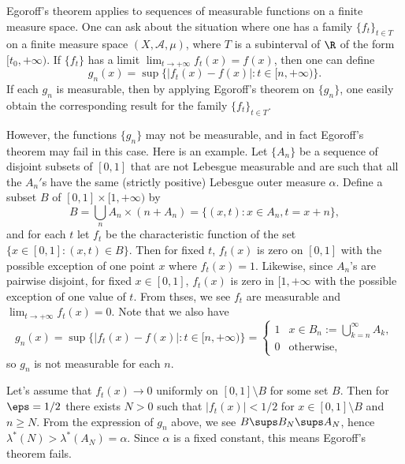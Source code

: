 \begin{example}
Egoroff's theorem applies to sequences of measurable functions on a finite measure space. One can ask about the situation where one has a family $\{f_t\}_{t\in T}$ on a finite measure space $(X,\mathcal{A},\mu)$, where $T$ is a subinterval of $\R$ of the form $[t_0,+\infty)$. If $\{f_t\}$ has a limit $\lim_{t\to+\infty}f_t(x)=f(x)$, then one can define
\[g_n(x)=\sup\{|f_t(x)-f(x)|:t\in[n,+\infty)\}.\]
If each $g_n$ is measurable, then by applying Egoroff's theorem on $\{g_n\}$, one easily obtain the corresponding result for the family $\{f_t\}_{t\in T}$.\par
However, the functions $\{g_n\}$ may not be measurable, and in fact Egoroff's theorem may fail in this case. Here is an example. Let $\{A_n\}$ be a sequence of disjoint subsets of $[0,1]$ that are not Lebesgue measurable and are such that all the $A_n'$s have the same (strictly positive) Lebesgue outer measure $\alpha$. Define a subset $B$ of $[0,1]\times[1,+\infty)$ by
\[B=\bigcup_{n}A_n\times(n+A_n)=\{(x,t):x\in A_n,t=x+n\},\]
and for each $t$ let $f_t$ be the characteristic function of the set $\{x\in[0,1]:(x,t)\in B\}$. Then for fixed $t$, $f_t(x)$ is zero on $[0,1]$ with the possible exception of one point $x$ where $f_t(x)=1$. Likewise, since $A_n$'s are pairwise disjoint, for fixed $x\in[0,1]$, $f_t(x)$ is zero in $[1,+\infty$ with the possible exception of one value of $t$. From thses, we see $f_t$ are measurable and $\lim_{t\to+\infty}f_t(x)=0$. Note that we also have
\[g_n(x)=\sup\{|f_t(x)-f(x)|:t\in[n,+\infty)\}=\begin{cases}
1&x\in B_n:=\bigcup_{k=n}^{\infty}A_k,\\
0&\text{otherwise},
\end{cases}\]
so $g_n$ is not measurable for each $n$.\par
Let's assume that $f_t(x)\to 0$ uniformly on $[0,1]\setminus B$ for some set $B$. Then for $\eps=1/2$ there exists $N>0$ such that $|f_t(x)|<1/2$ for $x\in[0,1]\setminus B$ and $n\geq N$. From the expression of $g_n$ above, we see $B\sups B_N\sups A_N$, hence $\lambda^*(N)>\lambda^*(A_N)=\alpha$. Since $\alpha$ is a fixed constant, this means Egoroff's theorem fails.
\end{example}
